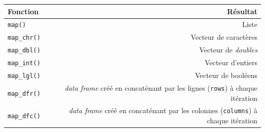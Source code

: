 \documentclass[
  11pt,
]{book}
\numberwithin{equation}{section}
\numberwithin{countremarque}{section}
\begin{document}
\begin{longtable}[]{@{}lr@{}}
\toprule
\begin{minipage}[b]{0.26\columnwidth}\raggedright
Fonction\strut
\end{minipage} & \begin{minipage}[b]{0.68\columnwidth}\raggedleft
Résultat\strut
\end{minipage}\tabularnewline
\midrule
\endhead
\begin{minipage}[t]{0.26\columnwidth}\raggedright
\texttt{map()}\strut
\end{minipage} & \begin{minipage}[t]{0.68\columnwidth}\raggedleft
Liste\strut
\end{minipage}\tabularnewline
\begin{minipage}[t]{0.26\columnwidth}\raggedright
\texttt{map\_chr()}\strut
\end{minipage} & \begin{minipage}[t]{0.68\columnwidth}\raggedleft
Vecteur de caractères\strut
\end{minipage}\tabularnewline
\begin{minipage}[t]{0.26\columnwidth}\raggedright
\texttt{map\_dbl()}\strut
\end{minipage} & \begin{minipage}[t]{0.68\columnwidth}\raggedleft
Vecteur de \emph{doubles}\strut
\end{minipage}\tabularnewline
\begin{minipage}[t]{0.26\columnwidth}\raggedright
\texttt{map\_int()}\strut
\end{minipage} & \begin{minipage}[t]{0.68\columnwidth}\raggedleft
Vecteur d'entiers\strut
\end{minipage}\tabularnewline
\begin{minipage}[t]{0.26\columnwidth}\raggedright
\texttt{map\_lgl()}\strut
\end{minipage} & \begin{minipage}[t]{0.68\columnwidth}\raggedleft
Vecteur de booléens\strut
\end{minipage}\tabularnewline
\begin{minipage}[t]{0.26\columnwidth}\raggedright
\texttt{map\_dfr()}\strut
\end{minipage} & \begin{minipage}[t]{0.68\columnwidth}\raggedleft
\emph{data frame} créé en concaténant par les lignes (\texttt{rows}) à chaque itération\strut
\end{minipage}\tabularnewline
\begin{minipage}[t]{0.26\columnwidth}\raggedright
\texttt{map\_dfc()}\strut
\end{minipage} & \begin{minipage}[t]{0.68\columnwidth}\raggedleft
\emph{data frame} créé en concaténant par les colonnes (\texttt{columns}) à chaque itération\strut
\end{minipage}\tabularnewline
\bottomrule
\end{longtable}
\end{document}
